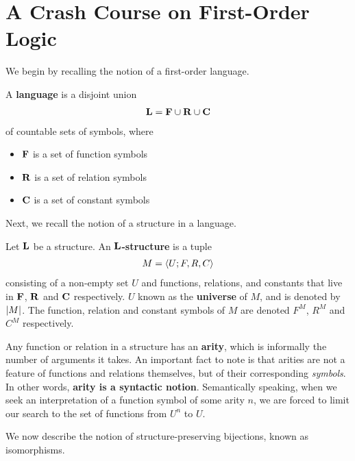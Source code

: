 \section{A Crash Course on First-Order Logic}

We begin by recalling the notion of a first-order language.

\begin{boxdefinition}[Language]
    A \textbf{language} is a disjoint union
    \begin{align*}
        \mathbf{L} = \mathbf{F} \cup \mathbf{R} \cup \mathbf{C}
    \end{align*}
    of countable sets of symbols, where
    \begin{itemize}
        \item $\mathbf{F}$ is a set of function symbols
        \item $\mathbf{R}$ is a set of relation symbols
        \item $\mathbf{C}$ is a set of constant symbols
    \end{itemize}
\end{boxdefinition}

Next, we recall the notion of a structure in a language.

\begin{boxdefinition}[Structure]
    Let $\mathbf{L}$ be a structure. An \textbf{$\mathbf{L}$-structure} is a tuple
    \begin{align*}
        M = \left\langle U; F, R, C \right\rangle
    \end{align*}
    consisting of a non-empty set $U$ and functions, relations, and constants that live in $\mathbf{F}$, $\mathbf{R}$ and $\mathbf{C}$ respectively. $U$ known as the \textbf{universe} of $M$, and is denoted by $\left\lvert M \right\rvert$. The function, relation and constant symbols of $M$ are denoted $F^M$, $R^M$ and $C^M$ respectively.
\end{boxdefinition}

Any function or relation in a structure has an \textbf{arity}, which is informally the number of arguments it takes. An important fact to note is that arities are not a feature of functions and relations themselves, but of their corresponding \textit{symbols}. In other words, \textbf{arity is a syntactic notion}. Semantically speaking, when we seek an interpretation of a function symbol of some arity $n$, we are forced to limit our search to the set of functions from $U^n$ to $U$.

We now describe the notion of structure-preserving bijections, known as isomorphisms.

